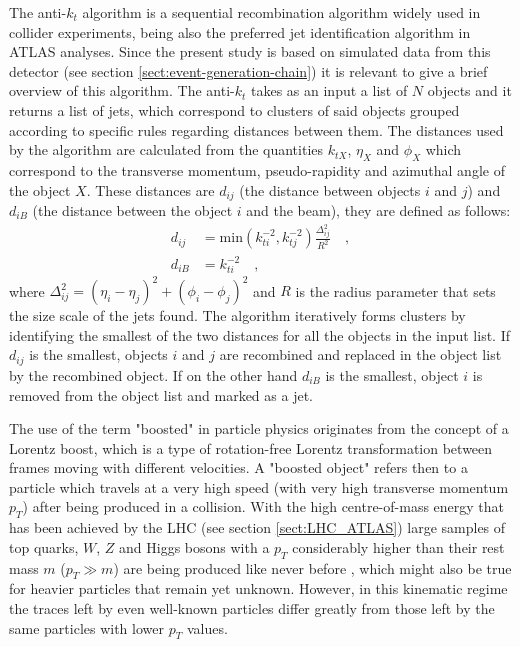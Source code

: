 \documentclass[main]{subfiles} %
\begin{document}
The anti-$k_t$ algorithm \cite{Cacciari2008} is a sequential recombination algorithm widely used in collider experiments, being also the preferred jet identification algorithm in ATLAS analyses. Since the present study is based on simulated data from this detector (see section \ref{sect:event-generation-chain}) it is relevant to give a brief overview of this algorithm. The anti-$k_t$ takes as an input a list of $N$ objects and it returns a list of jets, which correspond to clusters of said objects grouped according to specific rules regarding distances between them. The distances used by the algorithm are calculated from the quantities $k_{tX}$, $\eta_X$ and $\phi_X$ which correspond to the transverse momentum, pseudo-rapidity and azimuthal angle of the object $X$. These distances are $d_{ij}$ (the distance between objects $i$ and $j$) and $d_{iB}$ (the distance between the object $i$ and the beam), they are defined as follows:
\begin{align}
  d_{ij} &= \text{min}(k_{ti}^{-2},k_{tj}^{-2})\frac{\Delta_{ij}^2}{R^2} \quad ,\\
  d_{iB} &= k_{ti}^{-2} \quad ,
\end{align}
where $\Delta_{ij}^2 = (\eta_i - \eta_j)^2 + (\phi_i - \phi_j)^2$ and $R$ is the radius parameter that sets the size scale of the jets found. The algorithm iteratively forms clusters by identifying the smallest of the two distances for all the objects in the input list. If $d_{ij}$ is the smallest, objects $i$ and $j$ are recombined and replaced in the object list by the recombined object. If on the other hand $d_{iB}$ is the smallest, object $i$ is removed from the object list and marked as a jet.\\

\label{sect:boosted-particles}
\vspace{20pt}

The use of the term "boosted" in particle physics originates from the concept of a Lorentz boost, which is a type of rotation-free Lorentz transformation between frames moving with different velocities. A "boosted object" refers then to a particle which travels at a very high speed (with very high transverse momentum $p_T$) after being produced in a collision. With the high centre-of-mass energy that has been achieved by the LHC (see section \ref{sect:LHC_ATLAS}) large samples of top quarks, $W$, $Z$ and Higgs bosons with a $p_T$ considerably higher than their rest mass $m$ ($p_T \gg m$) are being produced like never before \cite{Altheimer2014}, which might also be true for heavier particles that remain yet unknown. However, in this kinematic regime the traces left by even well-known particles differ greatly from those left by the same particles with lower $p_T$ values.\\
\end{document}

